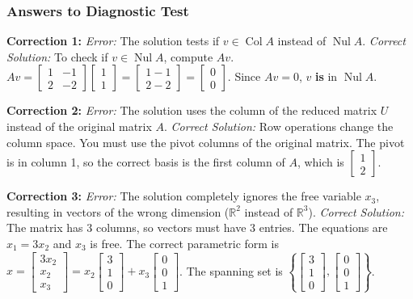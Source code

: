 \documentclass[11pt]{article}
\begin{document}
\hrulefill

\subsubsection*{Answers to Diagnostic Test}

\textbf{Correction 1:} 
\textit{Error:} The solution tests if $v \in \operatorname{Col} A$ instead of $\operatorname{Nul} A$. 
\textit{Correct Solution:} To check if $v \in \operatorname{Nul} A$, compute $Av$. $Av = \begin{bmatrix} 1 & -1 \\ 2 & -2 \end{bmatrix} \begin{bmatrix} 1 \\ 1 \end{bmatrix} = \begin{bmatrix} 1-1 \\ 2-2 \end{bmatrix} = \begin{bmatrix} 0 \\ 0 \end{bmatrix}$. Since $Av = 0$, $v$ \textbf{is} in $\operatorname{Nul} A$.

\textbf{Correction 2:} 
\textit{Error:} The solution uses the column of the reduced matrix $U$ instead of the original matrix $A$. 
\textit{Correct Solution:} Row operations change the column space. You must use the pivot columns of the original matrix. The pivot is in column 1, so the correct basis is the first column of $A$, which is $\begin{bmatrix} 1 \\ 2 \end{bmatrix}$.

\textbf{Correction 3:} 
\textit{Error:} The solution completely ignores the free variable $x_3$, resulting in vectors of the wrong dimension ($\mathbb{R}^2$ instead of $\mathbb{R}^3$). 
\textit{Correct Solution:} The matrix has 3 columns, so vectors must have 3 entries. The equations are $x_1 = 3x_2$ and $x_3$ is free. The correct parametric form is $x = \begin{bmatrix} 3x_2 \\ x_2 \\ x_3 \end{bmatrix} = x_2 \begin{bmatrix} 3 \\ 1 \\ 0 \end{bmatrix} + x_3 \begin{bmatrix} 0 \\ 0 \\ 1 \end{bmatrix}$. The spanning set is $\left\{ \begin{bmatrix} 3 \\ 1 \\ 0 \end{bmatrix}, \begin{bmatrix} 0 \\ 0 \\ 1 \end{bmatrix} \right\}$.
\end{document}

